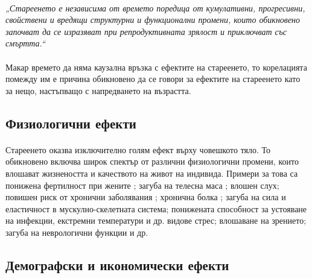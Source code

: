 \documentclass[pdftex,cyrillic,14pt,a4page,twoside,openright]{extreport}
\begin{document}
\paragraph{}
\textit{„Стареенето е независима от времето поредица от кумулативни, прогресивни, свойствени и вредящи структурни и функционални промени, които обикновено започват да се изразяват при репродуктивната зрялост и приключват със смъртта.“}

\paragraph{}
Макар времето да няма каузална връзка с ефектите на стареенето, то корелацията помежду им е причина обикновено да се говори за ефектите на стареенето като за нещо, настъпващо с напредването на възрастта.

\subsection{Физиологични ефекти}
\paragraph{}
Стареенето оказва изключително голям ефект върху човешкото тяло. То обикновено включва широк спектър от различни физиологични промени, които влошават жизнеността и качеството на живот на индивида. Примери за това са понижена фертилност при жените \cite{kamath2010}; загуба на телесна маса \cite{spencer1996}; влошен слух\cite{feder2015}; повишен риск от хронични заболявания \cite{larson2013}\cite{prasad2012}; хронична болка \cite{geriatrics2002}; загуба на сила и еластичност в мускулно-скелетната система; понижената способност за устояване на инфекции, екстремни температури и др. видове стрес; влошаване на зрението; загуба на неврологични функции \cite{vina2007} и др.


\subsection{Демографски и икономически ефекти}
\end{document}
